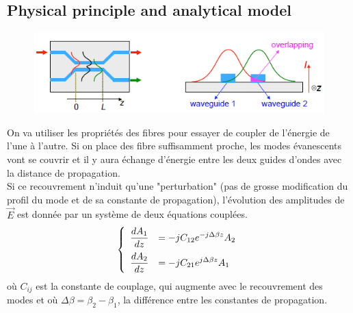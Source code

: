\subsection{Physical principle and analytical model}
	\begin{figure}
	\vspace{-5mm}
	\includegraphics[scale=0.5]{ch3/image2}
	\end{figure}
On va utiliser les propriétés des fibres pour essayer de coupler de l'énergie de l'une à l'autre. 
Si on place des fibre suffisamment proche, les modes évanescents vont se couvrir et il y aura
échange d'énergie entre les deux guides d'ondes avec la distance de propagation. \\

Si ce recouvrement n'induit qu'une "perturbation" (pas de grosse modification du profil du mode et
de sa constante de propagation), l'évolution des amplitudes de $\vec{E}$ est donnée par un système de 
deux équations couplées. 
\begin{equation}
\left\{\begin{array}{ll}
\dfrac{{d{A_1}}}{{dz}} &\DS=  - j{C_{12}}{e^{ - j\Delta \beta z}}{A_2}\vspace{2mm}\\
\dfrac{{d{A_2}}}{{dz}} &\DS=  - j{C_{21}}{e^{j\Delta \beta z}}{A_1}
\end{array}\right.
\end{equation}
où $C_{ij}$ est la constante de couplage, qui augmente avec le recouvrement des modes et 
où $\Delta\beta = \beta_2-\beta_1$, la différence entre les constantes de propagation.\\

